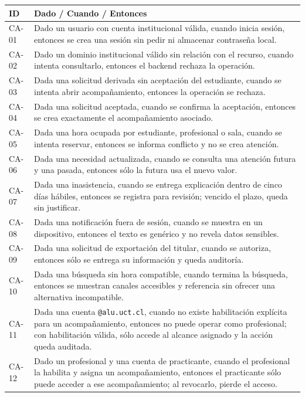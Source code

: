 \documentclass[10pt,a4paper,oneside]{article}
\begin{document}
\small
\begin{tabularx}{\textwidth}{@{}L{0.12\textwidth}Y@{}}
\toprule\textbf{ID} & \textbf{Dado / Cuando / Entonces}\\\midrule
CA-01 & Dado un usuario con cuenta institucional válida, cuando inicia sesión, entonces se crea una sesión sin pedir ni almacenar contraseña local.\\
CA-02 & Dado un dominio institucional válido sin relación con el recurso, cuando intenta consultarlo, entonces el backend rechaza la operación.\\
CA-03 & Dada una solicitud derivada sin aceptación del estudiante, cuando se intenta abrir acompañamiento, entonces la operación se rechaza.\\
CA-04 & Dada una solicitud aceptada, cuando se confirma la aceptación, entonces se crea exactamente el acompañamiento asociado.\\
CA-05 & Dada una hora ocupada por estudiante, profesional o sala, cuando se intenta reservar, entonces se informa conflicto y no se crea atención.\\
CA-06 & Dada una necesidad actualizada, cuando se consulta una atención futura y una pasada, entonces sólo la futura usa el nuevo valor.\\
CA-07 & Dada una inasistencia, cuando se entrega explicación dentro de cinco días hábiles, entonces se registra para revisión; vencido el plazo, queda sin justificar.\\
CA-08 & Dada una notificación fuera de sesión, cuando se muestra en un dispositivo, entonces el texto es genérico y no revela datos sensibles.\\
CA-09 & Dada una solicitud de exportación del titular, cuando se autoriza, entonces sólo se entrega su información y queda auditoría.\\
CA-10 & Dada una búsqueda sin hora compatible, cuando termina la búsqueda, entonces se muestran canales accesibles y referencia sin ofrecer una alternativa incompatible.\\
CA-11 & Dada una cuenta \texttt{@alu.uct.cl}, cuando no existe habilitación explícita para un acompañamiento, entonces no puede operar como profesional; con habilitación válida, sólo accede al alcance asignado y la acción queda auditada.\\
CA-12 & Dado un profesional y una cuenta de practicante, cuando el profesional la habilita y asigna un acompañamiento, entonces el practicante sólo puede acceder a ese acompañamiento; al revocarlo, pierde el acceso.\\
\bottomrule
\end{tabularx}
\normalsize
\end{document}
